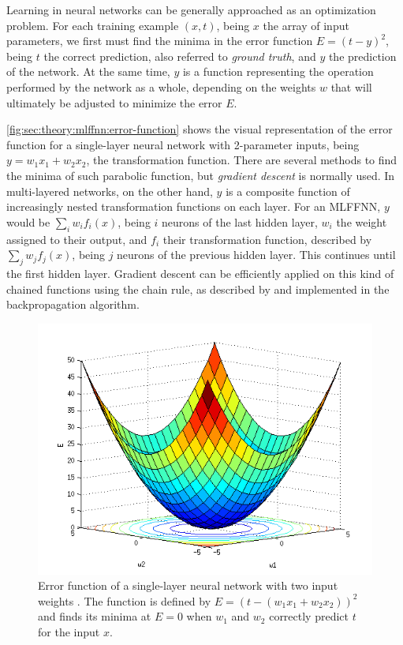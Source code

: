 Learning in neural networks can be generally approached as an optimization problem.
For each training example $(x, t)$, being $x$ the array of input parameters, we first must find the minima in the error function $E = (t - y)^2$, being $t$ the correct prediction, also referred to \emph{ground truth}, and $y$ the prediction of the network.
At the same time, $y$ is a function representing the operation performed by the network as a whole, depending on the weights $w$ that will ultimately be adjusted to minimize the error $E$.

\autoref{fig:sec:theory:mlffnn:error-function} shows the visual representation of the error function for a single-layer neural network with 2-parameter inputs, being $y = w_1 x_1 + w_2 x_2$, the transformation function.
There are several methods to find the minima of such parabolic function, but \emph{gradient descent} is normally used.
In multi-layered networks, on the other hand, $y$ is a composite function of increasingly nested transformation functions on each layer.
For an MLFFNN, $y$ would be $\sum_i w_i f_i(x)$, being $i$ neurons of the last hidden layer, $w_i$ the weight assigned to their output, and $f_i$ their transformation function, described by $\sum_j w_j f_j(x)$, being $j$ neurons of the previous hidden layer.
This continues until the first hidden layer.
Gradient descent can be efficiently applied on this kind of chained functions using the chain rule, as described by \citet{Linnainmaa1976} and implemented in the backpropagation algorithm.

\begin{figure}[htb]
  \includegraphics[width=\textwidth]{gfx/error-function}
  \caption{Error function of a single-layer neural network with two input weights \cite{AI4562013}.
    The function is defined by $E = (t - (w_1 x_1 + w_2 x_2))^2$ and finds its minima at $E = 0$ when $w_1$ and $w_2$ correctly predict $t$ for the input $x$.}
  \label{fig:sec:theory:mlffnn:error-function}
\end{figure}

